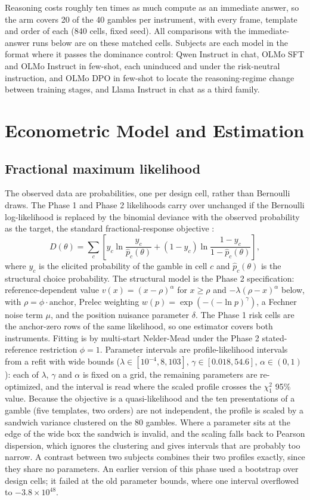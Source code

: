 \documentclass[11pt]{article}
\begin{document}
Reasoning costs roughly ten times as much compute as an immediate answer, so the arm covers 20 of the
40 gambles per instrument, with every frame, template and order of each (840 cells, fixed seed). All
comparisons with the immediate-answer runs below are on these matched cells. Subjects are each model in
the format where it passes the dominance control: Qwen Instruct in chat, OLMo SFT and OLMo Instruct in
few-shot, each uninduced and under the risk-neutral instruction, and OLMo DPO in few-shot to locate
the reasoning-regime change between training stages, and Llama Instruct in chat as a third family.

\section{Econometric Model and Estimation}

\subsection{Fractional maximum likelihood}
The observed data are probabilities, one per design cell, rather than Bernoulli draws. The Phase 1 and
Phase 2 likelihoods carry over unchanged if the Bernoulli log-likelihood is replaced by the binomial
deviance with the observed probability as the target, the standard fractional-response objective
\citep{papke1996}:
\[
  D(\theta) = \sum_{c} \left[ y_c \ln \frac{y_c}{\hat p_c(\theta)}
  + (1 - y_c)\ln \frac{1 - y_c}{1 - \hat p_c(\theta)} \right],
\]
where $y_c$ is the elicited probability of the gamble in cell $c$ and $\hat p_c(\theta)$ is the
structural choice probability. The structural model is the Phase 2 specification: reference-dependent
value $v(x) = (x-\rho)^{\alpha}$ for $x \ge \rho$ and $-\lambda(\rho - x)^{\alpha}$ below, with
$\rho = \phi\cdot\text{anchor}$, Prelec weighting $w(p) = \exp(-(-\ln p)^{\gamma})$, a Fechner noise
term $\mu$, and the position nuisance parameter $\delta$. The Phase 1 risk cells are the anchor-zero
rows of the same likelihood, so one estimator covers both instruments. Fitting is by multi-start
Nelder-Mead under the Phase 2 stated-reference restriction $\phi = 1$. Parameter intervals are
profile-likelihood intervals from a refit with wide bounds ($\lambda \in [10^{-4}, 8{,}103]$,
$\gamma \in [0.018, 54.6]$, $\alpha \in (0, 1)$): each of $\lambda$, $\gamma$ and $\alpha$ is fixed on a
grid, the remaining parameters are re-optimized, and the interval is read where the scaled profile
crosses the $\chi^2_1$ 95\% value. Because the objective is a quasi-likelihood and the ten presentations
of a gamble (five templates, two orders) are not independent, the profile is scaled by a sandwich
variance clustered on the 80 gambles. Where a parameter sits at the edge of the wide box the sandwich is
invalid, and the scaling falls back to Pearson dispersion, which ignores the clustering and gives
intervals that are probably too narrow. A contrast between two subjects combines their two profiles
exactly, since they share no parameters. An earlier version of this phase used a bootstrap over design
cells; it failed at the old parameter bounds, where one interval overflowed to $-3.8\times10^{48}$.
\end{document}
